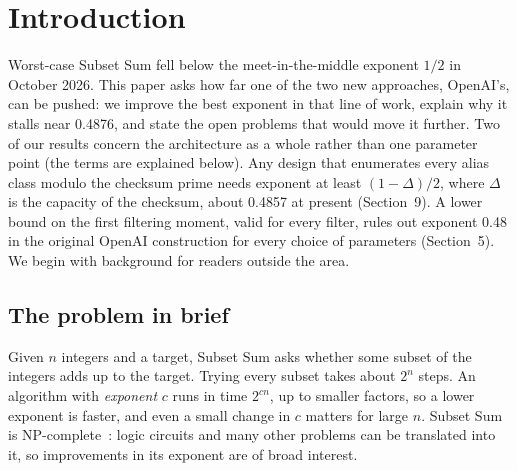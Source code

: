 \documentclass[11pt]{article}
\theoremstyle{plain}
\begin{document}
\section{Introduction}

Worst-case Subset Sum fell below the meet-in-the-middle exponent $1/2$ in October 2026. This paper asks how far one of the two new approaches, OpenAI's, can be pushed: we improve the best exponent in that line of work, explain why it stalls near 0.4876, and state the open problems that would move it further. Two of our results concern the architecture as a whole rather than one parameter point (the terms are explained below). Any design that enumerates every alias class modulo the checksum prime needs exponent at least $(1 - \Delta)/2$, where $\Delta$ is the capacity of the checksum, about 0.4857 at present (Section~9). A lower bound on the first filtering moment, valid for every filter, rules out exponent 0.48 in the original OpenAI construction for every choice of parameters (Section~5). We begin with background for readers outside the area.

\subsection*{The problem in brief}
Given $n$ integers and a target, Subset Sum asks whether some subset of the integers adds up to the target. Trying every subset takes about $2^n$ steps. An algorithm with \emph{exponent} $c$ runs in time $2^{cn}$, up to smaller factors, so a lower exponent is faster, and even a small change in $c$ matters for large $n$. Subset Sum is NP-complete~\cite{karp}: logic circuits and many other problems can be translated into it, so improvements in its exponent are of broad interest.
\end{document}
